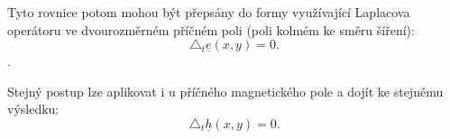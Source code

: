 \documentclass[12pt,a4paper,oneside]{article}
\numberwithin{equation}{section} %
\numberwithin{figure}{section} %
\numberwithin{table}{section} %
\newcommand{\faz}[1]{{\underline{#1}}} %
\begin{document}
Tyto rovnice potom mohou být přepsány do formy využívající Laplacova operátoru ve dvourozměrném příčném poli (poli kolmém ke směru šíření):
\begin{equation}
\triangle _t \faz{e} (x, y) = 0 .
\end{equation}
.

Stejný postup lze aplikovat i u příčného magnetického pole a dojít ke stejnému výsledku:
\begin{equation}
\triangle _t \faz{h} (x, y) = 0 .
\end{equation}


%
%
\end{document}
